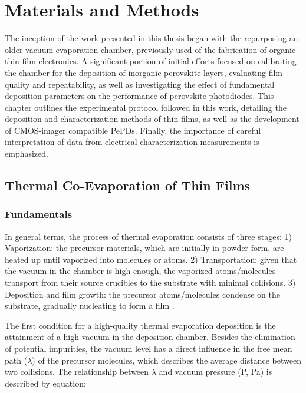 \chapter{Materials and Methods}\label{ch:material_properties}

The inception of the work presented in this thesis began with the repurposing an older vacuum evaporation chamber, previously used of the fabrication of organic thin film electronics. A significant portion of initial efforts focused on calibrating the chamber for the deposition of inorganic perovskite layers, evaluating film quality and repeatability, as well as investigating the effect of fundamental deposition parameters on the performance of perovskite photodiodes. This chapter outlines the experimental protocol followed in this work, detailing the deposition and characterization methods of  thin films, as well as the development of CMOS-imager compatible PePDs. Finally, the importance of careful interpretation of data from electrical characterization measurements is emphasized. 

\section{Thermal Co-Evaporation of  Thin Films}

\subsection{Fundamentals} \label{sec:materials_methods:fundamentals}

In general terms, the process of thermal evaporation consists of three stages: 1) Vaporization: the precursor materials, which are initially in powder form, are heated up until vaporized into molecules or atoms. 2) Transportation: given that the vacuum in the chamber is high enough, the vaporized atoms/molecules transport from their source crucibles to the substrate with minimal collisions. 3) Deposition and film growth: the precursor atoms/molecules condense on the substrate, gradually nucleating to form a film \cite{Du2022ThermalOutlook}. 

The first condition for a high-quality thermal evaporation deposition is the attainment of a high vacuum in the deposition chamber. Besides the elimination of potential impurities, the vacuum level has a direct influence in the free mean path ($\lambda$) of the precursor molecules, which describes the average distance between two collisions. The relationship between $\lambda$ and vacuum pressure (P, Pa) is described by equation:

